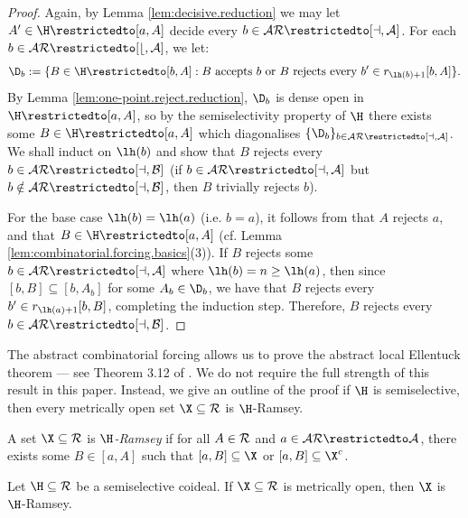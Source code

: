 \documentclass[11pt,reqno]{amsart}
\begin{document}
\begin{proof}
    Again, by Lemma \ref{lem:decisive.reduction} we may let $A' \in \H\restrictedto[a,A]$ decide every $b \in \cal{AR}\restrictedto[a,A]$. For each $b \in \cal{AR}\restrictedto[b,A]$, we let:
    \begin{align*}
        \D_b := \{B \in \H\restrictedto[b,A] : \text{$B$ accepts $b$ or $B$ rejects every $b' \in r_{\lh(b)+1}[b,A]$}\}.
    \end{align*}
    By Lemma \ref{lem:one-point.reject.reduction}, $\D_b$ is dense open in $\H\restrictedto[a,A]$, so by the semiselectivity property of $\H$ there exists some $B \in \H\restrictedto[a,A]$ which diagonalises $\{\D_b\}_{b\in\cal{AR}\restrictedto[a,A]}$. We shall induct on $\lh(b)$ and show that $B$ rejects every $b \in \cal{AR}\restrictedto[a,B]$ (if $b \in \cal{AR}\restrictedto[a,A]$ but $b \notin \cal{AR}\restrictedto[a,B]$, then $B$ trivially rejects $b$).

    For the base case $\lh(b) = \lh(a)$ (i.e. $b = a$), it follows from that $A$ rejects $a$, and that $B \in \H\restrictedto[a,A]$ (cf. Lemma \ref{lem:combinatorial.forcing.basics}(3)). If $B$ rejects some $b \in \cal{AR}\restrictedto[a,A]$ where $\lh(b) = n \geq \lh(a)$, then since $[b,B] \subseteq [b,A_b]$ for some $A_b \in \D_b$, we have that $B$ rejects every $b' \in r_{\lh(a)+1}[b,B]$, completing the induction step. Therefore, $B$ rejects every $b \in \cal{AR}\restrictedto[a,B]$.
\end{proof}

The abstract combinatorial forcing allows us to prove the abstract local Ellentuck theorem --- see Theorem 3.12 of \cite{DMN15}. We do not require the full strength of this result in this paper. Instead, we give an outline of the proof if $\H$ is semiselective, then every metrically open set $\X \subseteq \cal{R}$ is $\H$-Ramsey.

\begin{definition}
    A set $\X \subseteq \cal{R}$ is \emph{$\H$-Ramsey} if for all $A \in \cal{R}$ and $a \in \cal{AR}\restrictedto A$, there exists some $B \in [a,A]$ such that $[a,B] \subseteq \X$ or $[a,B] \subseteq \X^c$.
\end{definition}

\begin{proposition}
\label{prop:open.is.H-ramsey}
    Let $\H \subseteq \cal{R}$ be a semiselective coideal. If $\X \subseteq \cal{R}$ is metrically open, then $\X$ is $\H$-Ramsey.
\end{proposition}
\end{document}
